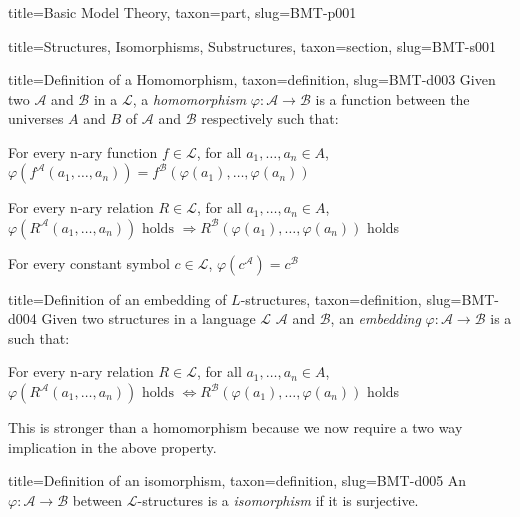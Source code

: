 \documentclass[a4paper]{article}
\begin{document}
\begin{tree}{title={Basic Model Theory}, taxon={part}, slug={BMT-p001}}
\begin{tree}{title={Structures, Isomorphisms, Substructures}, taxon={section}, slug={BMT-s001}}
\begin{tree}{title={Definition of a Homomorphism}, taxon={definition}, slug={BMT-d003}}
Given two  \(\mathcal {A}\) and \(\mathcal {B}\) in a  \(\mathcal {L}\), a \emph{homomorphism} \(\varphi :  \mathcal {A}  \rightarrow   \mathcal {B}\)
is a function between the universes \(A\) and \(B\) of \(\mathcal {A}\) and \(\mathcal {B}\) respectively such that:\par{ For every n-ary function \(f \in   \mathcal {L}\), for all \(a_1, \dots , a_n \in  A\), \(\varphi (f^{ \mathcal {A}}(a_1, \dots , a_n)) = f^{ \mathcal {B}}( \varphi (a_1), \dots ,  \varphi (a_n))\)}\par{For every n-ary relation \(R \in   \mathcal {L}\), for all \(a_1, \dots , a_n  \in  A\), \(\varphi (R^{ \mathcal {A}}(a_1, \dots , a_n))  \text { holds }  \Rightarrow  R^{ \mathcal {B}}( \varphi (a_1),  \dots ,  \varphi (a_n))\) holds}\par{For every constant symbol \(c  \in   \mathcal {L}\), \(\varphi (c^{ \mathcal {A}}) =c^{ \mathcal {B}}\)}
\end{tree}

\begin{tree}{title={Definition of an embedding of \(L\)-structures}, taxon={definition}, slug={BMT-d004}}
Given two structures in a language \(\mathcal {L}\) \(\mathcal {A}\) and \(\mathcal {B}\), an \emph{embedding} \(\varphi :  \mathcal {A}  \rightarrow   \mathcal {B}\)
is a  such that:\par{For every n-ary relation \(R \in   \mathcal {L}\), for all \(a_1, \dots , a_n  \in  A\), \(\varphi (R^{ \mathcal {A}}(a_1, \dots , a_n))  \text { holds }  \Leftrightarrow  R^{ \mathcal {B}}( \varphi (a_1),  \dots ,  \varphi (a_n))\) holds}\par{This is stronger than a homomorphism because we now require a two way implication in the above property.}
\end{tree}

\begin{tree}{title={Definition of an isomorphism}, taxon={definition}, slug={BMT-d005}}
An  \(\varphi :  \mathcal {A}  \rightarrow   \mathcal {B}\) between \(\mathcal {L}\)-structures is a \emph{isomorphism} if it is surjective.
\end{tree}


\end{tree}
\end{tree}
\end{document}

